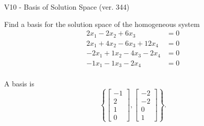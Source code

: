 \begin{exercise}
  \begin{exerciseTitle}V10 - Basis of Solution Space (ver. 344)\end{exerciseTitle}
  \begin{exerciseStatement}
    Find a basis for the solution space of the homogeneous system 
\begin{align*}
 2 x_ 1 -2 x_ 2 + 6 x_ 3 &= 0  \\ 
  2 x_ 1 + 4 x_ 2 -6 x_ 3 + 12 x_ 4 &= 0  \\ 
  -2 x_ 1 + 1 x_ 2 -4 x_ 3 -2 x_ 4 &= 0  \\ 
  -1 x_ 1 -1 x_ 3 -2 x_ 4 &= 0  \\ 
 \end{align*}


 
  \end{exerciseStatement}

  \begin{exerciseAnswer}
   A basis is   
\[\left\{\left[\begin{array}{c}
-1 \\
2 \\
1 \\
0
\end{array}\right] , \left[\begin{array}{c}
-2 \\
-2 \\
0 \\
1
\end{array}\right]\right\}.\]

  


  \end{exerciseAnswer}
\end{exercise}
